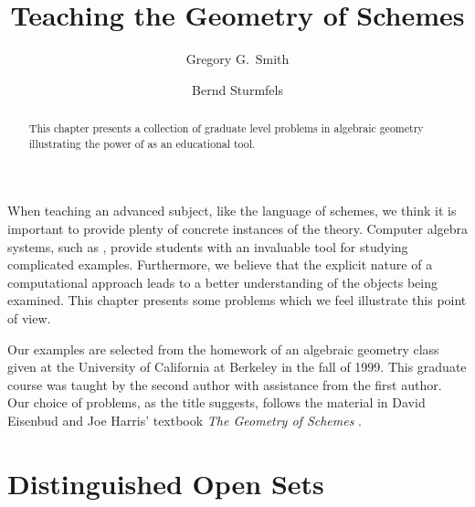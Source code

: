 \title{Teaching the Geometry of Schemes}

\author{Gregory G.~Smith \and Bernd Sturmfels}

\maketitle


\newtheorem*{problem*}{Problem}{\bfseries\upshape}{\itshape}
\newtheorem*{solution*}{Solution}{\itshape}{\rmfamily}

\newcommand{\Spec}{\operatorname{Spec}}
\newcommand{\Proj}{\operatorname{Proj}}
\newcommand{\codim}{\operatorname{codim}}


\begin{abstract}
This chapter presents a collection of graduate level problems in
algebraic geometry illustrating the power of \Mtwo as an educational
tool.
\end{abstract}

When teaching an advanced subject, like the language of schemes, we
think it is important to provide plenty of concrete instances of the
theory.  Computer algebra systems, such as \Mtwo, provide students
with an invaluable tool for studying complicated examples.
Furthermore, we believe that the explicit nature of a computational
approach leads to a better understanding of the objects being
examined.  This chapter presents some problems which we feel
illustrate this point of view.

Our examples are selected from the homework of an algebraic geometry
class given at the University of California at Berkeley in the fall of 1999.
This graduate course was taught by the second author with assistance from the
first author.  Our choice of problems, as the title suggests, follows the
material in David Eisenbud and Joe Harris' textbook {\em The Geometry of
  Schemes} \cite{SC:EH}.

\section{Distinguished Open Sets}

